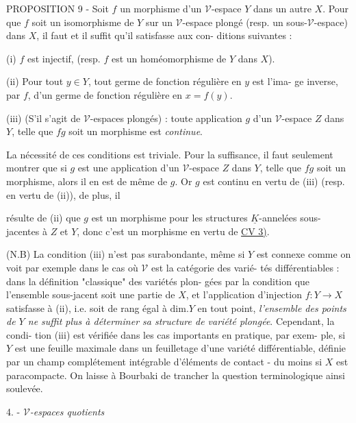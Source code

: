 PROPOSITION 9 - Soit $f$ un morphisme d'un $\mathcal{V}$-espace $Y$ dans un autre $X$.
Pour que $f$ soit un isomorphisme de $Y$ sur un $\mathcal{V}$-espace plongé (resp. un
sous-$\mathcal{V}$-espace) dans $X$, il faut et il suffit qu'il satisfasse aux con-
ditions suivantes :

(i) $f$ est injectif, (resp. $f$ est un homéomorphisme de $Y$ dans $X$).

(ii) Pour tout $y \in Y$, tout germe de fonction régulière en $y$ est l'ima-
ge inverse, par $f$, d'un germe de fonction régulière en $x=f(y)$.

(iii) (S'il s'agit de $\mathcal{V}$-espaces plongés) : toute application $g$ d'un
$\mathcal{V}$-espace $Z$ dans $Y$, telle que $fg$ soit un morphisme est \emph{continue}.

La nécessité de ces conditions est triviale. Pour la suffisance, il
faut seulement montrer que si $g$ est une application d'un $\mathcal{V}$-espace $Z$
dans $Y$, telle que $fg$ soit un morphisme, alors il en est de même de $g$.
Or $g$ est continu en vertu de (iii) (resp. en vertu de (ii)), de plus, il

\newpage



résulte de (ii) que $g$ est un morphisme pour les structures $\underline{K}$-annelées
sous-jacentes à $Z$ et $Y$, donc c'est un morphisme en vertu de \underline{CV 3)}.

(N.B) La condition (iii) n'est pas surabondante, même si $Y$ est connexe
comme on voit par exemple dans le cas où $\mathcal{V}$ est la catégorie des varié-
tés différentiables : dans la définition "classique" des variétés plon-
gées par la condition que l'ensemble sous-jacent soit une partie de $X$,
et l'application d'injection $f:Y \to X$ satisfasse à (ii), i.e. soit de
rang égal à $\text{dim.} Y$ en tout point, \emph{l'ensemble des points de $Y$ ne suffit
plus à déterminer sa structure de variété plongée}. Cependant, la condi-
tion (iii) est vérifiée dans les cas importants en pratique, par exem-
ple, si $Y$ est une feuille maximale dans un feuilletage d'une variété
différentiable, définie par un champ complétement intégrable d'éléments
de contact - du moins si $X$ est paracompacte. On laisse à Bourbaki de
trancher la question terminologique ainsi soulevée.

4. - \emph{$\mathcal{V}$-espaces quotients}

